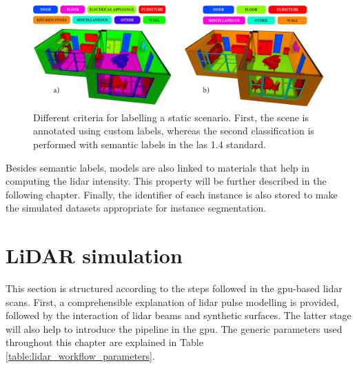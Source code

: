 \begin{figure}[ht]
    \centering
    \includegraphics[width=.85\linewidth]{figs/lidar_simulation/semantic_labels.png}
	\caption{Different criteria for labelling a static scenario. First, the scene is annotated using custom labels, whereas the second classification is performed with semantic labels in the \acrshort{las} 1.4 standard.}
	\label{fig:kitchen_classification}
\end{figure}

Besides semantic labels, models are also linked to materials that help in computing the \acrshort{lidar} intensity. This property will be further described in the following chapter. Finally, the identifier of each instance is also stored to make the simulated datasets appropriate for instance segmentation.

\section{LiDAR simulation}

This section is structured according to the steps followed in the \acrshort{gpu}-based \acrshort{lidar} scans. First, a comprehensible explanation of \acrshort{lidar} pulse modelling is provided, followed by the interaction of \acrshort{lidar} beams and synthetic surfaces. The latter stage will also help to introduce the pipeline in the \acrshort{gpu}. The generic parameters used throughout this chapter are explained in Table \ref{table:lidar_workflow_parameters}. 

